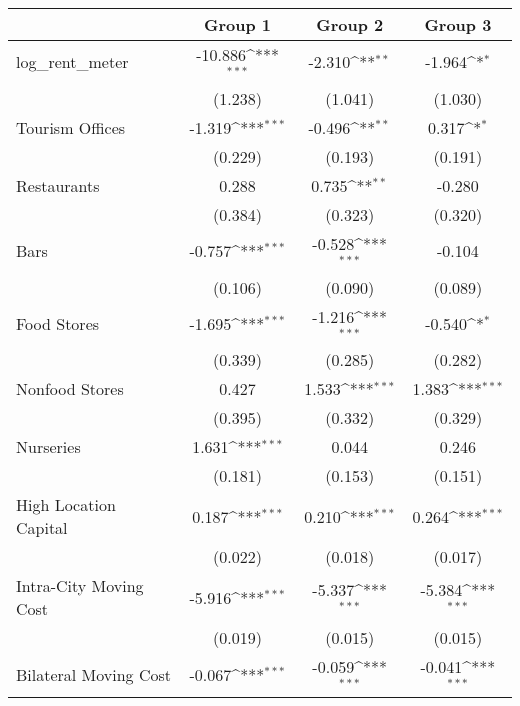 {
\def\sym#1{\ifmmode^{#1}\else\(^{#1}\)\fi}
\begin{tabular}{l*{3}{c}}
\hline\hline
            &\multicolumn{1}{c}{Group 1}&\multicolumn{1}{c}{Group 2}&\multicolumn{1}{c}{Group 3}\\
\hline
log\_rent\_meter&     -10.886\sym{***}&      -2.310\sym{**} &      -1.964\sym{*}  \\
            &     (1.238)         &     (1.041)         &     (1.030)         \\
Tourism Offices&      -1.319\sym{***}&      -0.496\sym{**} &       0.317\sym{*}  \\
            &     (0.229)         &     (0.193)         &     (0.191)         \\
Restaurants &       0.288         &       0.735\sym{**} &      -0.280         \\
            &     (0.384)         &     (0.323)         &     (0.320)         \\
Bars        &      -0.757\sym{***}&      -0.528\sym{***}&      -0.104         \\
            &     (0.106)         &     (0.090)         &     (0.089)         \\
Food Stores &      -1.695\sym{***}&      -1.216\sym{***}&      -0.540\sym{*}  \\
            &     (0.339)         &     (0.285)         &     (0.282)         \\
Nonfood Stores&       0.427         &       1.533\sym{***}&       1.383\sym{***}\\
            &     (0.395)         &     (0.332)         &     (0.329)         \\
Nurseries   &       1.631\sym{***}&       0.044         &       0.246         \\
            &     (0.181)         &     (0.153)         &     (0.151)         \\
High Location Capital&       0.187\sym{***}&       0.210\sym{***}&       0.264\sym{***}\\
            &     (0.022)         &     (0.018)         &     (0.017)         \\
Intra-City Moving Cost&      -5.916\sym{***}&      -5.337\sym{***}&      -5.384\sym{***}\\
            &     (0.019)         &     (0.015)         &     (0.015)         \\
Bilateral Moving Cost&      -0.067\sym{***}&      -0.059\sym{***}&      -0.041\sym{***}\\

\end{tabular}}
